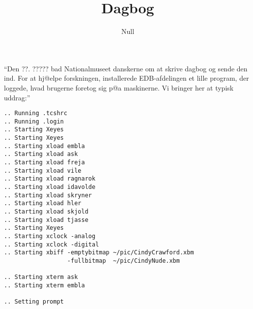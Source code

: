 \documentclass[a4paper,11pt]{article}
\title{Dagbog}
\author{Null}
\begin{document}
\maketitle

\begin{roles}

\strut


\end{roles}

\begin{sketch}


``Den ??. ????? bad Nationalmuseet danskerne om at skrive dagbog og
sende den ind. For at hj@elpe forskningen, installerede EDB-afdelingen
et lille program, der loggede, hvad brugerne foretog sig p@a
maskinerne. Vi bringer her at typisk uddrag:''

\begin{verbatim}
.. Running .tcshrc
.. Running .login
.. Starting Xeyes
.. Starting Xeyes
.. Starting xload embla
.. Starting xload ask
.. Starting xload freja
.. Starting xload vile
.. Starting xload ragnarok
.. Starting xload idavolde
.. Starting xload skryner
.. Starting xload hler
.. Starting xload skjold
.. Starting xload tjasse
.. Starting Xeyes
.. Starting xclock -analog
.. Starting xclock -digital
.. Starting xbiff -emptybitmap ~/pic/CindyCrawford.xbm 
                  -fullbitmap  ~/pic/CindyNude.xbm

.. Starting xterm ask
.. Starting xterm embla

.. Setting prompt


\end{verbatim}
\end{sketch}
\end{document}
